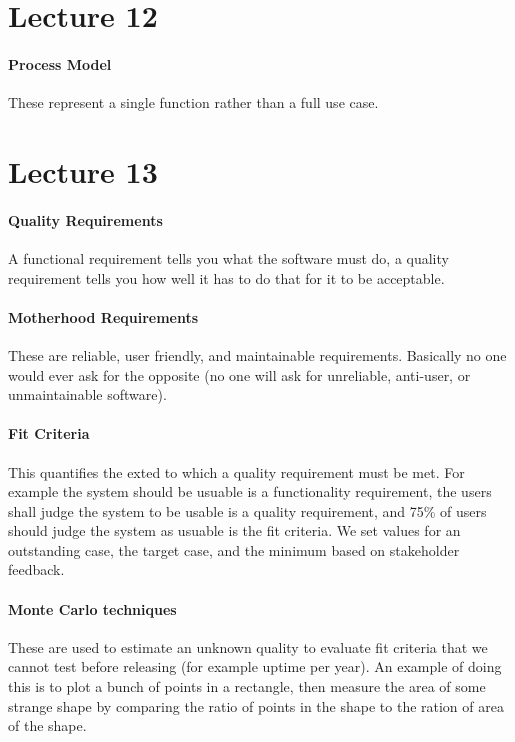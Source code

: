 \documentclass[12pt]{article}
\begin{document}



\section*{Lecture 12}
\label{sec:lecture_12}
\paragraph{Process Model} 
\label{par:process_model}
These represent a single function rather than a full use case. 


\section*{Lecture 13}
\label{sec:lecture_13}
\paragraph{Quality Requirements} 
\label{par:quality_requirements}
A functional requirement tells you what the software must do, a quality requirement tells you how well it has to do that for it to be acceptable.

\paragraph{Motherhood Requirements} 
\label{par:motherhood_requirements}
These are reliable, user friendly, and maintainable requirements. Basically no one would ever ask for the opposite (no one will ask for unreliable, anti-user, or unmaintainable software).

\paragraph{Fit Criteria} 
\label{par:fit_criteria}
This quantifies the exted to which a quality requirement must be met. For example the system should be usuable is a functionality requirement, the users shall judge the system to be usable is a quality requirement, and 75\% of users should judge the system as usuable is the fit criteria. We set values for an outstanding case, the target case, and the minimum based on stakeholder feedback.

\paragraph{Monte Carlo techniques} 
\label{par:monte_carlo_techniques}
These are used to estimate an unknown quality to evaluate fit criteria that we cannot test before releasing (for example uptime per year). An example of doing this is to plot a bunch of points in a rectangle, then measure the area of some strange shape by comparing the ratio of points in the shape to the ration of area of the shape.
\end{document}
